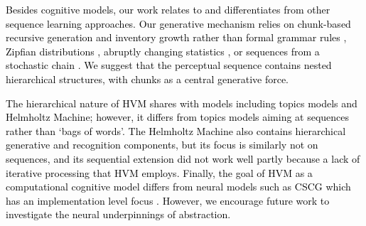 \documentclass{article} %
\theoremstyle{remark}
\newcommand{\peter}[1]{\textcolor{purple}{Peter: #1}}
\begin{document}
\textcolor{black}{Besides cognitive models, our work relates to and differentiates from other sequence learning approaches. Our generative mechanism relies on chunk-based recursive generation and inventory growth rather than formal grammar rules \citep{Jelinek1992,Johnson2006}, Zipfian distributions \citep{teh_hierarchical_2006}, abruptly changing statistics \citep{milan_forget-me-not_nodate}, or sequences from a stochastic chain \cite{willems_context-tree_1995}. We suggest that the perceptual sequence contains nested hierarchical structures, with chunks as a central generative force. 
}

\textcolor{black}{
The hierarchical nature of HVM shares with models including topics models and Helmholtz Machine; however, it differs from topics models \cite{blei2003latent, teh_hdp_2006} aiming at sequences rather than ‘bags of words’. The Helmholtz Machine also contains hierarchical generative and recognition components, but its focus is similarly not on sequences, and its sequential extension \cite{hinton1995helmholtz} did not work well partly because a lack of iterative processing that HVM employs. 
Finally, the goal of HVM as a computational cognitive model differs from neural models such as CSCG \citep{george_clone-structured_2021} which has an implementation level focus \cite{marr1982vision}. However, we encourage future work to investigate the neural underpinnings of abstraction.}
\end{document}
